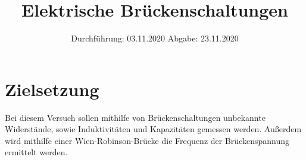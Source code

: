 

\subject{V302}
\title{Elektrische Brückenschaltungen}
\date{
    Durchführung: 03.11.2020
    \hspace{3em}
    Abgabe: 23.11.2020 %
}



\maketitle
\thispagestyle{empty}
\tableofcontents
\newpage

\section{Zielsetzung} \label{sec:Ziel}

Bei diesem Versuch sollen mithilfe von Brückenschaltungen unbekannte Widerstände, sowie Induktivitäten und Kapazitäten gemessen werden.
Außerdem wird mithilfe einer Wien-Robinson-Brücke die Frequenz der Brückenspannung ermittelt werden.


\newpage


\newpage


\newpage


